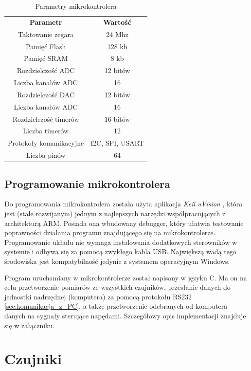 \documentclass[printmode]{mgr}
\begin{document}
\begin{table}[tp]
  \caption{Parametry mikrokontrolera}
  \label{tab:mikrokontroler}
  \centering
  \begin{tabular}{||c|c||}
    \hline\hline
{\bf Parametr} & {\bf Wartość} \\
Taktowanie zegara & 24 Mhz \\
Pamięć Flash & 128 kb \\
Pamięć SRAM & 8 kb \\
Rozdzielczość ADC & 12 bitów\\
Liczba kanałów ADC & 16\\
Rozdzielczość DAC & 12 bitów\\
Liczba kanałów ADC & 16\\
Rozdzielczość timerów & 16 bitów\\
Liczba timerów & 12\\
Protokoły komunikacyjne & I2C, SPI, USART\\
Liczba pinów & 64\\
\hline\hline
  \end{tabular}
\end{table}

\subsection{Programowanie mikrokontrolera}
Do programowania mikrokontrolera została użyta aplikacja \emph{Keil uVision} \cite{keil}, która jest (stale rozwijanym) jednym z najlepszych
narzędzi współpracujących z architekturą ARM. Posiada ona wbudowany debugger, który ułatwia testowanie poprawności
działania programu znajdującego się na mikrokontrolerze. Programowanie układu nie wymaga instalowania dodatkowych sterowników w systemie
i odbywa się za pomocą zwykłego kabla USB. Największą wadą tego środowiska jest kompatybilność jedynie z systemem operacyjnym Windows.

Program uruchamiany w mikrokontrolerze został napisany w języku C. Ma on na celu przetworzenie pomiarów ze wszystkich czujników,
przesłanie danych do jednostki nadrzędnej (komputera) za pomocą protokołu RS232 \ref{sec:komunikacja_z_PC}, a także przetworzenie 
odebranych od komputera danych na sygnały sterujące napędami. Szczegółowy opis implementacji znajduje się w załączniku.

\section{Czujniki}\label{sec:czujniki}
\end{document}
